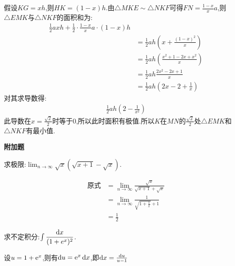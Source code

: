 \begin{questions}
\begin{solution}
		假设$KG=xh$,则$HK=(1-x)h$.由$\triangle{MKE} \sim \triangle{NKF}$可得$FN =
			\frac{1-x}{x}a$,则$\triangle{EMK}$与$\triangle{NKF}$的面积和为:
		\begin{align*}
			\frac12axh + \frac12\cdot\frac{1-x}{x}a\cdot(1-x)h
			\\                                                           & = \frac12ah(x + \frac{(1-x)^2}{x})
			\\                                                           & = \frac12ah(\frac{x^2 + 1 - 2x + x^2}{x})
			\\                                                         & = \frac12ah\frac{2x^2 - 2x + 1}{x}
			\\ & = \frac12ah(2x -2 + \frac1x)
		\end{align*}
		对其求导数得:
		\begin{align*}
			\frac12ah(2 - \frac{1}{x^2})
		\end{align*}
		此导数在$x =
			\frac{\sqrt{2}}{2}$时等于$0$,所以此时面积有极值.所以$K$在$MN$的$\frac{\sqrt{2}}{2}$处$\triangle{EMK}$和$\triangle{NKF}$有最小值.

	\end{solution}

	\begin{center}
		\textbf{附加题}
	\end{center}

	\question 求极限:$ \displaystyle \lim_{n\to\infty}\sqrt{x}(\sqrt{x+1} - \sqrt{x}) $.
	\begin{solution}
		\begin{align*}
			\text{原式} & = \lim_{n\to\infty}\frac{\sqrt{x}}{\sqrt{x+1} + \sqrt{x}} \\
			            & = \lim_{n\to\infty}\frac{1}{\sqrt{1 + \frac1x} + 1}       \\
			            & = \frac12
		\end{align*}
	\end{solution}
	\question 求不定积分:$\int\dfrac{\mathop{}\!\mathrm{d}x}{(1+e^x)^2}$.
	\begin{solution}
		设$u = 1 + \mathrm{e}^x$,则有$\mathop{}\!\mathrm{d}u = \mathrm{e}^x\mathop{}\!\mathrm{d}x$,即$\mathop{}\!\mathrm{d}x = \frac{\mathop{}\!\mathrm{d}u}{u-1}$


\end{solution}
\end{questions}
